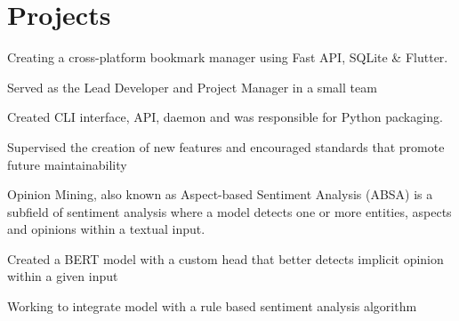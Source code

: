\documentclass[]{resume-template}
\begin{document}
\hfill
\begin{minipage}[t]{0.66\textwidth}


    \section{Projects}\label{sec:projects}

    \label{subsec: Bookie}
    \vspace{\topsep}
    \begin{tightemize}
        \item Creating a cross-platform bookmark manager using Fast API, SQLite \& Flutter.
        \item Served as the Lead Developer and Project Manager in a small team
        \item Created CLI interface, API, daemon and was responsible for Python packaging.
        \item Supervised the creation of new features and encouraged standards that promote future maintainability
    \end{tightemize}
    \vspace{\topsep}

    \label{subsec:opinionmining}
    \begin{tightemize}
        \item Opinion Mining, also known as Aspect-based Sentiment Analysis (ABSA) is a subfield of sentiment analysis
        where a model detects one or more entities, aspects and opinions within a textual input.
        \item Created a BERT model with a custom head that better detects implicit opinion within a given input
        \item Working to integrate model with a rule based sentiment analysis algorithm
    \end{tightemize}
    \vspace{\topsep}


\end{minipage}
\end{document}
